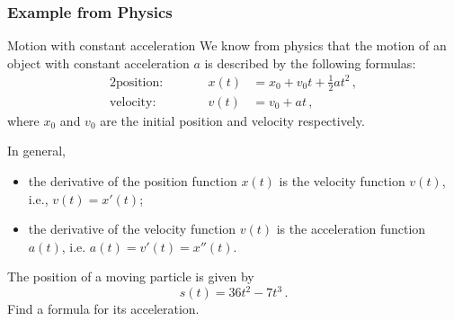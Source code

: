 \documentclass[10pt,t,presentation,ignorenonframetext,aspectratio=169]{beamer}
\begin{document}
\begin{frame}
  \frametitle{Example from Physics}
  \begin{block}{Motion with constant acceleration}
    We know from physics that the motion of an object with constant
    acceleration $a$ is described by the following formulas:
    \begin{alignat*}{2}
      \text{position:}&\qquad& x(t) & = x_0 + v_0t + \frac{1}{2}at^2 \,, \\
      \text{velocity:}&\qquad& v(t) & = v_0 + at \,,
    \end{alignat*}
    where $x_0$ and $v_0$ are the initial position and velocity
    respectively.
  \end{block}
  In general,
  \begin{itemize}
  \item the derivative of the position function $x(t)$ is the velocity
    function $v(t)$, i.e., $v(t) = x'(t)$;
  \item the derivative of the velocity function $v(t)$ is the
    acceleration function $a(t)$, i.e. $a(t) = v'(t) = x''(t)$.
  \end{itemize}
\end{frame}

\begin{frame}
  \vs{}
  \question{}
  The position of a moving particle is given by
  \[
    s(t) = 36t^2 - 7t^3 \,.
  \]
  Find a formula for its acceleration.
\end{frame}
\end{document}
